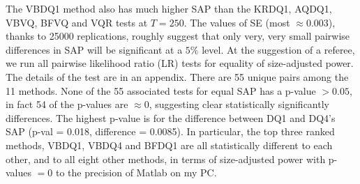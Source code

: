 \documentclass[12pt,epsf]{article}
\begin{document}
The VBDQ1 method also has much higher SAP than the KRDQ1, AQDQ1, VBVQ, BFVQ and VQR tests at $T=250$.
The values of SE (most $\approx 0.003$), thanks to 25000 replications, roughly suggest that only very, very small pairwise differences in 
SAP will be significant at a $5\%$ level. At the suggestion of a referee, we run all pairwise likelihood ratio (LR) tests for 
equality of size-adjusted power. The details of the test are in an appendix. There are 55 unique pairs among the 11 methods. 
None of the 55 associated tests for equal SAP has a p-value $> 0.05$, in fact 54 of the p-values are $\approx 0$, suggesting 
clear statistically significantly differences. The highest p-value is for the difference between DQ1 and DQ4's SAP 
(p-val = 0.018, difference = 0.0085). In particular, the top three ranked methods, VBDQ1, VBDQ4 and BFDQ1 are all statistically different 
to each other, and to all eight other methods, in terms of size-adjusted power with p-values $= 0$ to the precision of Matlab on my PC.
\end{document}
